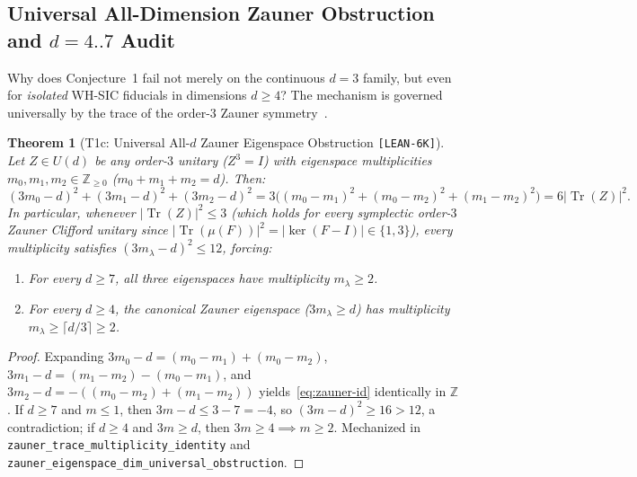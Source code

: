 \documentclass[11pt,letterpaper]{article}
\theoremstyle{plain}
\newtheorem{theorem}{Theorem}[section]
\theoremstyle{definition}
\theoremstyle{remark}
\newcommand{\Z}{\mathbb{Z}}
\newcommand{\Tr}{\operatorname{Tr}}
\newcommand{\leanref}[1]{\textnormal{\texttt{\footnotesize #1}}}
\newcommand{\tagbadge}[1]{\textnormal{\texttt{\small [#1]}}}
\begin{document}
\subsection{Universal All-Dimension Zauner Obstruction and \texorpdfstring{$d=4..7$}{d=4..7} Audit}

Why does Conjecture~1 fail not merely on the continuous $d=3$ family, but even for \emph{isolated} WH-SIC fiducials in dimensions $d\ge 4$? The mechanism is governed universally by the trace of the order-$3$ Zauner symmetry~\cite{Zauner2011,Appleby2005}.

\begin{theorem}[{T1c: Universal All-$d$ Zauner Eigenspace Obstruction \tagbadge{LEAN-6K}}]
\label{thm:t1c}
Let $Z\in U(d)$ be any order-$3$ unitary ($Z^3=I$) with eigenspace multiplicities $m_0,m_1,m_2\in\Z_{\ge 0}$ ($m_0+m_1+m_2=d$). Then:
\begin{equation}
\label{eq:zauner-id}
  (3m_0-d)^2 + (3m_1-d)^2 + (3m_2-d)^2 = 3\bigl((m_0-m_1)^2 + (m_0-m_2)^2 + (m_1-m_2)^2\bigr) = 6|\Tr(Z)|^2.
\end{equation}
In particular, whenever $|\Tr(Z)|^2\le 3$ (which holds for every symplectic order-$3$ Zauner Clifford unitary since $|\Tr(\mu(F))|^2=|\ker(F-I)|\in\{1,3\}$), every multiplicity satisfies $(3m_\lambda-d)^2\le 12$, forcing:
\begin{enumerate}[leftmargin=2em,itemsep=2pt]
  \item For every $d\ge 7$, \emph{all three} eigenspaces have multiplicity $m_\lambda\ge 2$.
  \item For every $d\ge 4$, the canonical Zauner eigenspace ($3m_\lambda\ge d$) has multiplicity $m_\lambda\ge \lceil d/3\rceil\ge 2$.
\end{enumerate}
\end{theorem}

\begin{proof}
Expanding $3m_0-d=(m_0-m_1)+(m_0-m_2)$, $3m_1-d=(m_1-m_2)-(m_0-m_1)$, and $3m_2-d=-((m_0-m_2)+(m_1-m_2))$ yields~\eqref{eq:zauner-id} identically in $\Z$. If $d\ge 7$ and $m\le 1$, then $3m-d\le 3-7=-4$, so $(3m-d)^2\ge 16>12$, a contradiction; if $d\ge 4$ and $3m\ge d$, then $3m\ge 4\implies m\ge 2$. Mechanized in \leanref{zauner\_trace\_multiplicity\_identity} and \leanref{zauner\_eigenspace\_dim\_universal\_obstruction}.
\end{proof}
\end{document}
